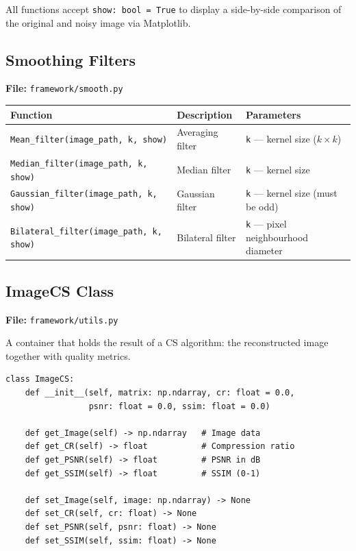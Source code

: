 \documentclass[12pt,a4paper]{article}
\newcommand{\cs}[1]{\texttt{#1}}          %
\begin{document}
All functions accept \verb|show: bool = True| to display a side-by-side
comparison of the original and noisy image via Matplotlib.

\subsection{Smoothing Filters}

\textbf{File:} \cs{framework/smooth.py}

\begin{center}
\begin{tabular}{p{5.5cm}p{4cm}p{4.5cm}}
  \toprule
  Function & Description & Parameters \\
  \midrule
  \cs{Mean\_filter(image\_path, k, show)}
    & Averaging filter
    & \cs{k} --- kernel size ($k \times k$) \\[4pt]
  \cs{Median\_filter(image\_path, k, show)}
    & Median filter
    & \cs{k} --- kernel size \\[4pt]
  \cs{Gaussian\_filter(image\_path, k, show)}
    & Gaussian filter
    & \cs{k} --- kernel size (must be odd) \\[4pt]
  \cs{Bilateral\_filter(image\_path, k, show)}
    & Bilateral filter
    & \cs{k} --- pixel neighbourhood diameter \\
  \bottomrule
\end{tabular}
\end{center}

\subsection{ImageCS Class}

\textbf{File:} \cs{framework/utils.py}

A container that holds the result of a CS algorithm: the reconstructed image
together with quality metrics.

\begin{lstlisting}[style=python]
class ImageCS:
    def __init__(self, matrix: np.ndarray, cr: float = 0.0,
                 psnr: float = 0.0, ssim: float = 0.0)

    def get_Image(self) -> np.ndarray   # Image data
    def get_CR(self) -> float           # Compression ratio
    def get_PSNR(self) -> float         # PSNR in dB
    def get_SSIM(self) -> float         # SSIM (0-1)

    def set_Image(self, image: np.ndarray) -> None
    def set_CR(self, cr: float) -> None
    def set_PSNR(self, psnr: float) -> None
    def set_SSIM(self, ssim: float) -> None
\end{lstlisting}
\end{document}
